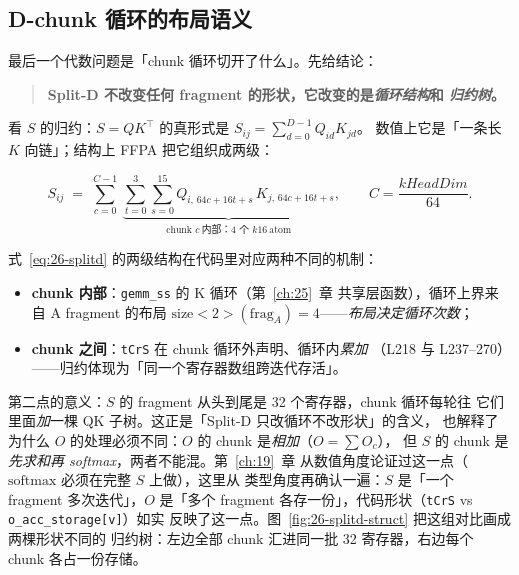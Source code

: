 \subsection{D-chunk 循环的布局语义}

最后一个代数问题是「chunk 循环切开了什么」。先给结论：

\begin{quote}
  \textbf{Split-D 不改变任何 fragment 的形状，它改变的是\emph{循环结构}和
  \emph{归约树}。}
\end{quote}

看 $S$ 的归约：$S = QK^{\top}$ 的真形式是 $S_{ij} = \sum_{d=0}^{D-1}Q_{id}K_{jd}$。
数值上它是「一条长 $K$ 向链」；结构上 FFPA 把它组织成两级：

\begin{equation}
  S_{ij} \;=\; \sum_{c=0}^{C-1}\ \underbrace{\sum_{t=0}^{3}\sum_{s=0}^{15}
  Q_{i,\,64c+16t+s}\,K_{j,\,64c+16t+s}}_{\text{chunk } c\ \text{内部：4 个 } k16\ \text{atom}} ,
  \qquad C = \frac{kHeadDim}{64} .
  \label{eq:26-splitd}
\end{equation}

式~\eqref{eq:26-splitd} 的两级结构在代码里对应两种不同的机制：

\begin{itemize}[itemsep=2pt,topsep=2pt]
  \item \textbf{chunk 内部}：\texttt{gemm\_ss} 的 K 循环（第~\ref{ch:25}~章
        共享层函数），循环上界来自 A fragment 的布局
        $\mathrm{size}<2>(\mathrm{frag}_A)=4$——\emph{布局决定循环次数}；
  \item \textbf{chunk 之间}：\texttt{tCrS} 在 chunk 循环外声明、循环内\emph{累加}
        （L218 与 L237--270）——归约体现为「同一个寄存器数组跨迭代存活」。
\end{itemize}

第二点的意义：$S$ 的 fragment 从头到尾是 32 个寄存器，chunk 循环每轮往
它们里面\emph{加}一棵 QK 子树。这正是「Split-D 只改循环不改形状」的含义，
也解释了为什么 $O$ 的处理必须不同：$O$ 的 chunk 是\emph{相加}（$O=\sum O_c$），
但 $S$ 的 chunk 是\emph{先求和再 softmax}，两者不能混。第~\ref{ch:19}~章
从数值角度论证过这一点（$\mathrm{softmax}$ 必须在完整 $S$ 上做），这里从
类型角度再确认一遍：$S$ 是「一个 fragment 多次迭代」，$O$ 是「多个 fragment
各存一份」，代码形状（\texttt{tCrS} vs \texttt{o\_\allowbreak{}acc\_\allowbreak{}storage[v]}）如实
反映了这一点。图~\ref{fig:26-splitd-struct} 把这组对比画成两棵形状不同的
归约树：左边全部 chunk 汇进同一批 32 寄存器，右边每个 chunk 各占一份存储。


